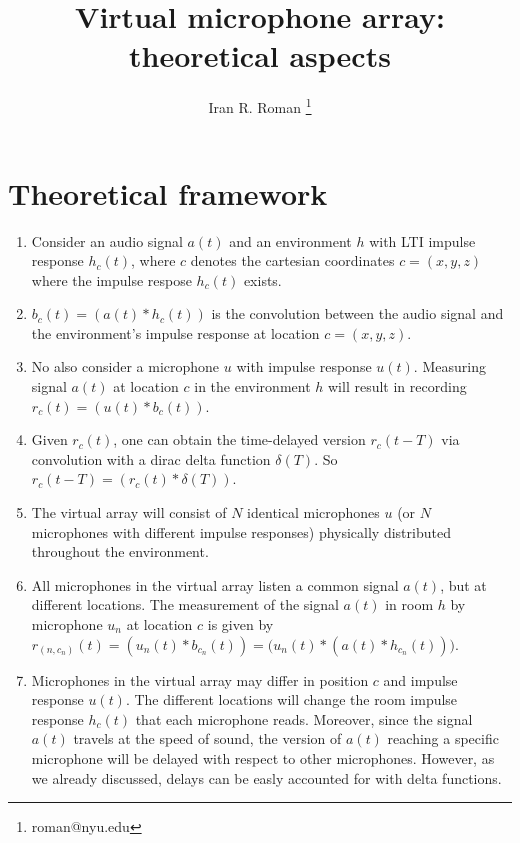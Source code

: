 \documentclass[14pt]{extarticle}
\title{Virtual microphone array: theoretical aspects}
\author{Iran R. Roman \thanks{roman@nyu.edu}}
\affil{Music and Audio Research Laboratory, New York University}
\date{}
\begin{document}
\maketitle
\tableofcontents

\vspace{.25in}

\section{Theoretical framework}

\begin{enumerate}

\item Consider an audio signal $a(t)$ and an environment $h$ with LTI impulse response $h_c(t)$, where $c$ denotes the cartesian coordinates $c=(x,y,z)$ where the impulse respose $h_c(t)$ exists.

\item $b_c(t) = (a(t) \ast h_c(t))$ is the convolution between the audio signal and the environment's impulse response at location $c=(x,y,z)$. 

\item No also consider a microphone $u$ with impulse response $u(t)$. Measuring signal $a(t)$ at location $c$ in the environment $h$ will result in recording $r_c(t) = (u(t) \ast b_c(t))$.

\item Given $r_c(t)$, one can obtain the time-delayed version $r_c(t-T)$ via convolution with a dirac delta function $\delta(T)$. So $r_c(t-T) = (r_c(t) \ast \delta(T))$.

\item The virtual array will consist of $N$ identical microphones $u$ (or $N$ microphones with different impulse responses) physically distributed throughout the environment.

\item All microphones in the virtual array listen a common signal $a(t)$, but at different locations. The measurement of the signal $a(t)$ in room $h$ by microphone $u_n$ at location $c$ is given by $r_{(n,c_n)}(t) = (u_n(t) \ast b_{c_n}(t)) = \big(u_n(t) \ast (a(t) \ast h_{c_n}(t))\big)$.

\item Microphones in the virtual array may differ in position $c$ and impulse response $u(t)$. The different locations will change the room impulse response $h_c(t)$ that each microphone reads. Moreover, since the signal $a(t)$ travels at the speed of sound, the version of $a(t)$ reaching a specific microphone will be delayed with respect to other microphones. However, as we already discussed, delays can be easly accounted for with delta functions. 


\end{enumerate}
\end{document}
